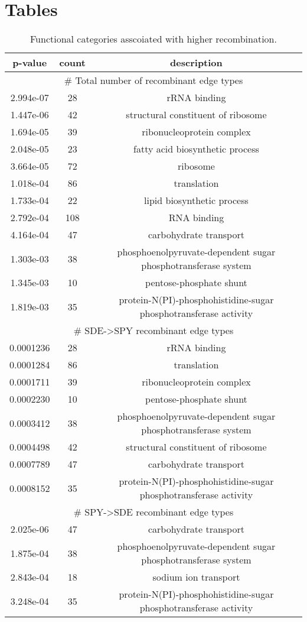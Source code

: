 \documentclass[english]{article}
\providecommand{\tabularnewline}{\\}
\begin{document}
\clearpage{}


\section*{Tables}

\clearpage{}

%
\begin{table}
\caption{\label{tab:functional}Functional categories asscoiated with higher
recombination.}
\begin{tabular}{|c|c|c|}
\hline 
p-value & count & description\tabularnewline
\hline
\hline 
\multicolumn{3}{|c|}{\# Total number of recombinant edge types}\tabularnewline
\hline 
2.994e-07 &  28 & rRNA binding\tabularnewline
\hline 
1.447e-06 &  42 & structural constituent of ribosome\tabularnewline
\hline 
1.694e-05 &  39 & ribonucleoprotein complex\tabularnewline
\hline 
2.048e-05 &  23 & fatty acid biosynthetic process\tabularnewline
\hline 
3.664e-05 &  72 & ribosome\tabularnewline
\hline 
1.018e-04 &  86 & translation\tabularnewline
\hline 
1.733e-04 &  22 & lipid biosynthetic process\tabularnewline
\hline 
2.792e-04 & 108 & RNA binding\tabularnewline
\hline 
4.164e-04 &  47 & carbohydrate transport\tabularnewline
\hline 
1.303e-03 &  38 & phosphoenolpyruvate-dependent sugar phosphotransferase 
system\tabularnewline
\hline 
1.345e-03 &  10 & pentose-phosphate shunt\tabularnewline
\hline 
1.819e-03 &  35 & protein-N(PI)-phosphohistidine-sugar phosphotransferase 
activity\tabularnewline
\hline 
\multicolumn{3}{|c|}{\# SDE->SPY recombinant edge types}\tabularnewline
\hline 
0.0001236 & 28 & rRNA binding\tabularnewline
\hline 
0.0001284 & 86 & translation\tabularnewline
\hline 
0.0001711 & 39 & ribonucleoprotein complex\tabularnewline
\hline 
0.0002230 & 10 & pentose-phosphate shunt\tabularnewline
\hline 
0.0003412 & 38 & phosphoenolpyruvate-dependent sugar phosphotransferase 
system\tabularnewline
\hline 
0.0004498 & 42 & structural constituent of ribosome\tabularnewline
\hline 
0.0007789 & 47 & carbohydrate transport\tabularnewline
\hline 
0.0008152 & 35 & protein-N(PI)-phosphohistidine-sugar phosphotransferase 
activity\tabularnewline
\hline 
\multicolumn{3}{|c|}{\# SPY->SDE recombinant edge types}\tabularnewline
\hline 
2.025e-06 & 47 & carbohydrate transport\tabularnewline
\hline 
1.875e-04 & 38 & phosphoenolpyruvate-dependent sugar phosphotransferase 
system\tabularnewline
\hline 
2.843e-04 & 18 & sodium ion transport\tabularnewline
\hline 
3.248e-04 & 35 & protein-N(PI)-phosphohistidine-sugar phosphotransferase 
activity\tabularnewline
\hline
\end{tabular}


\end{table}
\end{document}
